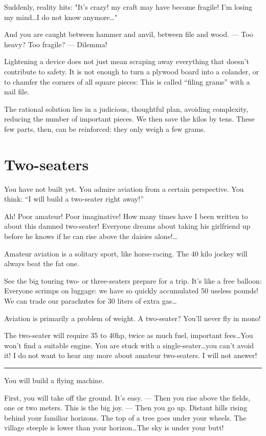 \documentclass{book}
\newcommand*\sectline{
  \vspace{5pt}
  \begin{center}
    \rule{0.5\linewidth}{\linethickness}
  \end{center}
  \vspace{5pt}
}
\begin{document}
Suddenly, reality hits: "It's crazy! my craft may have become fragile!
I'm losing my mind\ldots I do not know anymore\ldots"

And you are caught between hammer and anvil, between file and
wood. --- Too heavy? Too fragile? --- Dilemma!

Lightening a device does not just mean scraping away everything that
doesn't contribute to safety. It is not enough to turn a plywood board
into a colander, or to chamfer the corners of all square pieces: This
is called ``filing grams'' with a nail file.

The rational solution lies in a judicious, thoughtful plan, avoiding
complexity, reducing the number of important pieces. We then save the
kilos by tens. These few parts, then, can be reinforced: they only
weigh a few grams.

\section{Two-seaters}

You have not built yet. You admire aviation from a certain perspective.
You think: ``I will build a two-seater right away!''

Ah! Poor amateur! Poor imaginative! How many times have I been written
to about this damned two-seater! Everyone dreams about taking his
girlfriend up before he knows if he can rise above the daisies
alone!\ldots{}

Amateur aviation is a solitary sport, like horse-racing. The 40 kilo
jockey will always beat the fat one.

See the big touring two- or three-seaters prepare for a trip. It's
like a free balloon: Everyone scrimps on luggage: we have so quickly
accumulated 50 useless pounds! We can trade our parachutes for 30
liters of extra gas\ldots

Aviation is primarily a problem of weight. A two-seater? You'll never
fly in mono!

The two-seater will require 35 to 40hp, twice as much fuel, important
fees\ldots You won't find a suitable engine. You are stuck with a
single-seater\ldots you can't avoid it!  I do not want to hear any
more about amateur two-seaters. I will not answer!

\sectline

You will build a flying machine.

First, you will take off the ground. It's easy. --- Then you rise
above the fields, one or two meters. This is the big joy. --- Then you
go up.  Distant hills rising behind your familiar horizons. The top of
a tree goes under your wheels. The village steeple is lower than your
horizon\ldots The sky is under your butt!
\end{document}

